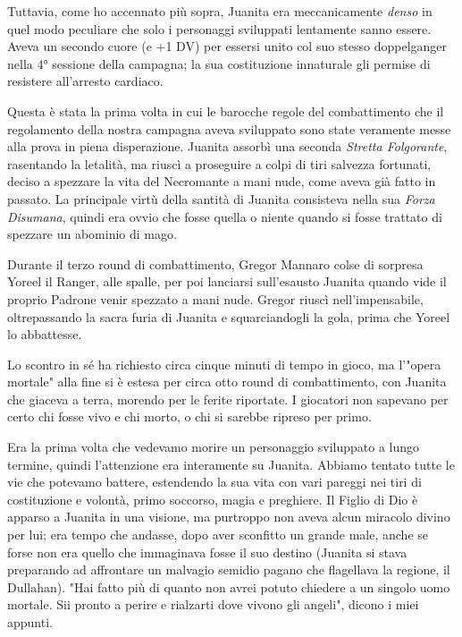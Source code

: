 Tuttavia, come ho accennato più sopra, Juanita era meccanicamente \textit{denso} in quel modo peculiare che solo i personaggi sviluppati lentamente sanno essere. Aveva un secondo cuore (e +1 DV) per essersi unito col suo stesso doppelganger nella 4° sessione della campagna; la sua costituzione innaturale gli permise di resistere all'arresto cardiaco.

Questa è stata la prima volta in cui le barocche regole del combattimento che il regolamento della nostra campagna aveva sviluppato sono state veramente messe alla prova in piena disperazione. Juanita assorbì una seconda \textit{Stretta Folgorante}, rasentando la letalità, ma riuscì a proseguire a colpi di tiri salvezza fortunati, deciso a spezzare la vita del Necromante a mani nude, come aveva già fatto in passato. La principale virtù della santità di Juanita consisteva nella sua \textit{Forza Disumana}, quindi era ovvio che fosse quella o niente quando si fosse trattato di spezzare un abominio di mago.

Durante il terzo round di combattimento, Gregor Mannaro colse di sorpresa Yoreel il Ranger, alle spalle, per poi lanciarsi sull'esausto Juanita quando vide il proprio Padrone venir spezzato a mani nude. Gregor riuscì nell'impensabile, oltrepassando la sacra furia di Juanita e squarciandogli la gola, prima che Yoreel lo abbattesse.

Lo scontro in sé ha richiesto circa cinque minuti di tempo in gioco, ma l'"opera mortale" alla fine si è estesa per circa otto round di combattimento, con Juanita che giaceva a terra, morendo per le ferite riportate. I giocatori non sapevano per certo chi fosse vivo e chi morto, o chi si sarebbe ripreso per primo.

Era la prima volta che vedevamo morire un personaggio sviluppato a lungo termine, quindi l'attenzione era interamente su Juanita. Abbiamo tentato tutte le vie che potevamo battere, estendendo la sua vita con vari pareggi nei tiri di costituzione e volontà, primo soccorso, magia e preghiere. Il Figlio di Dio è apparso a Juanita in una visione, ma purtroppo non aveva alcun miracolo divino per lui; era tempo che andasse, dopo aver sconfitto un grande male, anche se forse non era quello che immaginava fosse il suo destino (Juanita si stava preparando ad affrontare un malvagio semidio pagano che flagellava la regione, il Dullahan). "Hai fatto più di quanto non avrei potuto chiedere a un singolo uomo mortale. Sii pronto a perire e rialzarti dove vivono gli angeli", dicono i miei appunti.

